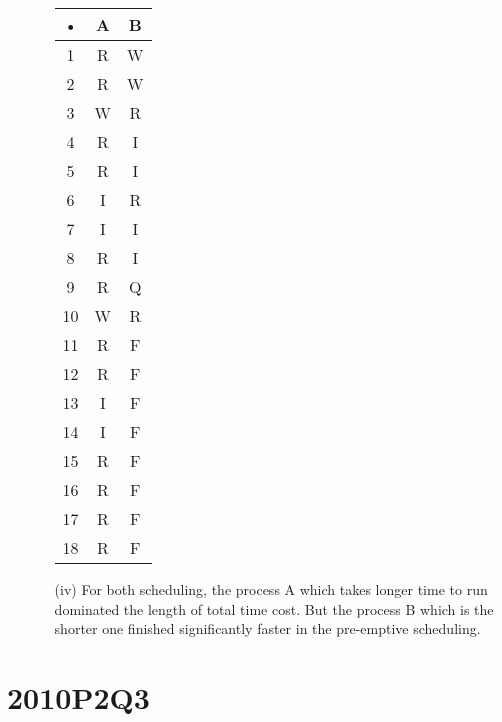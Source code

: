 \documentclass[10pt,twoside,a4paper]{article}
\begin{document}
\begin{itemize}
\begin{itemize}
\begin{tabular}{|c|c|c|}
\hline 
• & A & B \\ 
\hline 
1 & R & W \\ 
\hline 
2 & R & W \\ 
\hline 
3 & W & R \\ 
\hline 
4 & R & I \\ 
\hline 
5 & R & I \\ 
\hline 
6 & I & R \\ 
\hline 
7 & I & I \\ 
\hline 
8 & R & I \\ 
\hline 
9 & R & Q \\ 
\hline 
10 & W & R \\ 
\hline 
11 & R & F \\ 
\hline 
12 & R & F \\ 
\hline 
13 & I & F \\ 
\hline 
14 & I & F \\ 
\hline 
15 & R & F \\ 
\hline 
16 & R & F \\ 
\hline 
17 & R & F \\ 
\hline 
18 & R & F \\ 
\hline 
\end{tabular}
\item[(iv)]
For both scheduling, the process A which takes longer time to run dominated the length of total time cost. But the process B which is the shorter one finished significantly faster in the pre-emptive scheduling.
\end{itemize}
\end{itemize}

\section{2010P2Q3}
\end{document}
